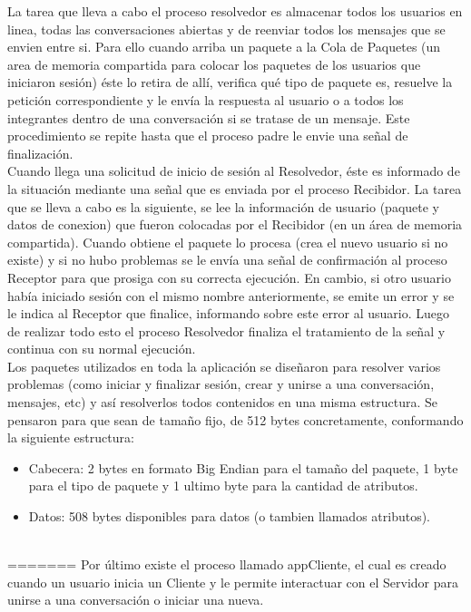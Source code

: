 \documentclass[a4paper,12pt,titlepage]{article}
\begin{document}
La tarea que lleva a cabo el proceso resolvedor es almacenar todos los usuarios en linea, todas las conversaciones abiertas y de reenviar 
todos los mensajes que se envien entre si. Para ello cuando arriba un paquete a la Cola de Paquetes (un area de memoria compartida para colocar 
los paquetes de los usuarios que iniciaron sesión) éste lo retira de allí, verifica qué tipo de paquete es, resuelve la petición correspondiente y 
le envía la respuesta al usuario o a todos los integrantes dentro de una conversación si se tratase de un mensaje. Este procedimiento se repite 
hasta que el proceso padre le envie una señal de finalización.\\

Cuando llega una solicitud de inicio de sesión al Resolvedor, éste es informado de la situación mediante una señal que es enviada por el proceso 
Recibidor. La tarea que se lleva a cabo es la siguiente, se lee la información de usuario (paquete y datos de conexion) que fueron colocadas por 
el Recibidor (en un área de memoria compartida). Cuando obtiene el paquete lo procesa (crea el nuevo usuario si no existe) y si no hubo problemas 
se le envía una señal de confirmación al proceso Receptor para que prosiga con su correcta ejecución. En cambio, si otro usuario había iniciado 
sesión con el mismo nombre anteriormente, se emite un error y se le indica al Receptor que finalice, informando sobre este error al usuario. Luego 
de realizar todo esto el proceso Resolvedor finaliza el tratamiento de la señal y continua con su normal ejecución.\\

Los paquetes utilizados en toda la aplicación se diseñaron para resolver varios problemas (como iniciar y finalizar sesión, crear y unirse a una 
conversación, mensajes, etc) y así resolverlos todos contenidos en una misma estructura.
Se pensaron para que sean de tamaño fijo, de 512 bytes concretamente, conformando la siguiente estructura:

\begin{itemize}
\item Cabecera: 2 bytes en formato Big Endian para el tamaño del paquete, 1 byte para el tipo de paquete y 1 ultimo byte para la cantidad de atributos.
\item Datos: 508 bytes disponibles para datos (o tambien llamados atributos).
\end{itemize}\\
=======
Por último existe el proceso llamado appCliente, el cual es creado cuando un usuario inicia un Cliente y le permite interactuar con
el Servidor para unirse a una conversación o iniciar una nueva.\\
\end{document}
